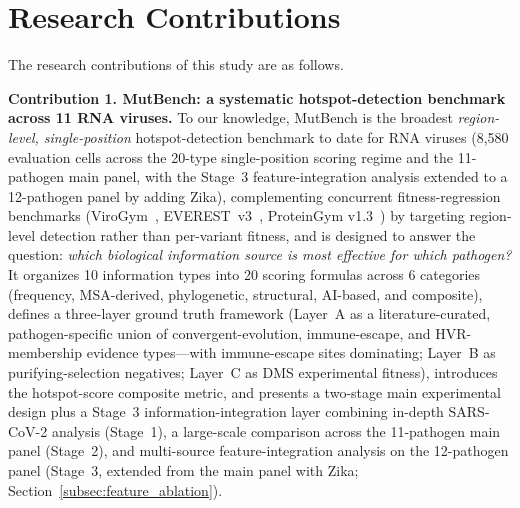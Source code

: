 \section{Research Contributions}
\label{sec:intro_contributions}

The research contributions of this study are as follows.

\textbf{Contribution 1. MutBench: a systematic hotspot-detection benchmark across 11 RNA viruses.}
To our knowledge, MutBench is the broadest \emph{region-level, single-position} hotspot-detection benchmark to date for RNA viruses (8{,}580 evaluation cells across the 20-type single-position scoring regime and the 11-pathogen main panel, with the Stage~3 feature-integration analysis extended to a 12-pathogen panel by adding Zika), complementing concurrent fitness-regression benchmarks (ViroGym~\cite{virogym2026}, EVEREST~v3~\cite{gurev2026everest_v3}, ProteinGym v1.3~\cite{notin2025proteingym_v13}) by targeting region-level detection rather than per-variant fitness, and is designed to answer the question: \emph{which biological information source is most effective for which pathogen?}
It organizes 10 information types into 20 scoring formulas across 6 categories (frequency, MSA-derived, phylogenetic, structural, AI-based, and composite), defines a three-layer ground truth framework (Layer~A as a literature-curated, pathogen-specific union of convergent-evolution, immune-escape, and HVR-membership evidence types---with immune-escape sites dominating; Layer~B as purifying-selection negatives; Layer~C as DMS experimental fitness), introduces the hotspot-score composite metric, and presents a two-stage main experimental design plus a Stage~3 information-integration layer combining in-depth SARS-CoV-2 analysis (Stage~1), a large-scale comparison across the 11-pathogen main panel (Stage~2), and multi-source feature-integration analysis on the 12-pathogen panel (Stage~3, extended from the main panel with Zika; Section~\ref{subsec:feature_ablation}).

